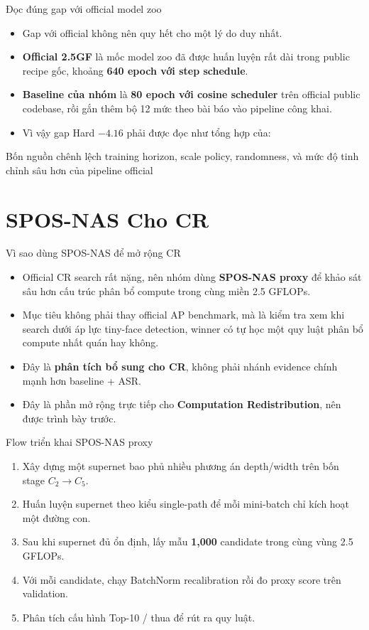 \documentclass[aspectratio=169,11pt]{beamer}
\begin{document}
\begin{frame}{Đọc đúng gap với official model zoo}
  \begin{itemize}
    \item Gap với official không nên quy hết cho một lý do duy nhất.
    \item \textbf{Official 2.5GF} là mốc model zoo đã được huấn luyện rất dài trong public recipe gốc, khoảng \textbf{640 epoch với step schedule}.
    \item \textbf{Baseline của nhóm} là \textbf{80 epoch với cosine scheduler} trên official public codebase, rồi gắn thêm bộ 12 mức theo bài báo vào pipeline công khai.
    \item Vì vậy gap Hard \(-4.16\) phải được đọc như tổng hợp của:
  \end{itemize}
  \begin{block}{Bốn nguồn chênh lệch}
    training horizon, scale policy, randomness, và mức độ tinh chỉnh sâu hơn của pipeline official
  \end{block}
\end{frame}

\section{SPOS-NAS Cho CR}

\begin{frame}{Vì sao dùng SPOS-NAS để mở rộng CR}
  \begin{itemize}
    \item Official CR search rất nặng, nên nhóm dùng \textbf{SPOS-NAS proxy} để khảo sát sâu hơn cấu trúc phân bổ compute trong cùng miền 2.5 GFLOPs.
    \item Mục tiêu không phải thay official AP benchmark, mà là kiểm tra xem khi search dưới áp lực tiny-face detection, winner có tự học một quy luật phân bổ compute nhất quán hay không.
    \item Đây là \textbf{phân tích bổ sung cho CR}, không phải nhánh evidence chính mạnh hơn baseline + ASR.
    \item Đây là phần mở rộng trực tiếp cho \textbf{Computation Redistribution}, nên được trình bày trước.
  \end{itemize}
\end{frame}

\begin{frame}{Flow triển khai SPOS-NAS proxy}
  \begin{enumerate}
    \item Xây dựng một supernet bao phủ nhiều phương án depth/width trên bốn stage \(C_2 \rightarrow C_5\).
    \item Huấn luyện supernet theo kiểu single-path để mỗi mini-batch chỉ kích hoạt một đường con.
    \item Sau khi supernet đủ ổn định, lấy mẫu \textbf{1,000} candidate trong cùng vùng 2.5 GFLOPs.
    \item Với mỗi candidate, chạy BatchNorm recalibration rồi đo proxy score trên validation.
    \item Phân tích cấu hình Top-10 / thua để rút ra quy luật.
  \end{enumerate}
\end{frame}
\end{document}
